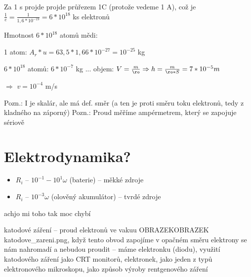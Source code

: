 \documentclass{article}
\begin{document}
Za 1 s projde projde průřezem 1C (protože vedeme 1 A), což je $\frac{1}{e} = \frac{1}{1,6*10^{-19}} = 6*10^{18}$ ks elektronů

Hmotnost $6*10^{18}$ atomů mědi:

  \hspace{10 px} 1 atom: $A_r * u = 63,5 * 1,66 * 10^{-27} = 10^{-25}$ kg

  \hspace{10 px} $6*10^{18}$ atomů: $6*10^{-7}$ kg ... objem: $V = \frac{m}{\ro} \Rightarrow h = \frac{m}{\ro*S} = 7*10^{-5} m$

\hspace{-10 px} $\Rightarrow$ $v = 10^{-4} $ m/s

Pozn.: I je skalár, ale má def. směr (a ten je proti směru toku elektronů, tedy z kladného na záporný)
Pozn.: Proud měříme ampérmetrem, který se zapojuje sériově

\part{Elektrodynamika?}
\begin{itemize}
  \item $R_i$ -- $10^{-1} - 10^{1} \omega$ (baterie) -- měkké zdroje
  \item $R_i$ -- $10^{-3} \omega$ (olověný akumulátor) -- tvrdé zdroje
\end{itemize}

achjo mi toho tak moc chybí

\item katodové záření -- proud elektronů ve vakuu OBRAZEKOBRAZEK katodove_zareni.png, když tento obvod zapojíme v opačném směru elektrony se nám nahromadí a nebudou proudit -- máme elektronku (diodu), využití katodového záření jako CRT monitorů, elektronek, jako jeden z typů elektronového mikroskopu, jako způsob výroby rentgenového záření
\end{document}
